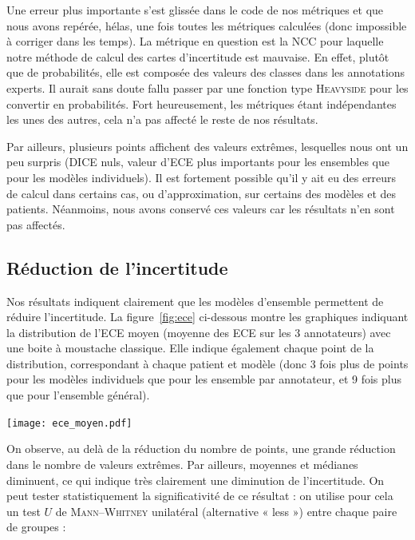 \documentclass[a4paper,french,bookmarks,12pt]{article}
\begin{document}
    Une erreur plus importante s'est glissée dans le code de nos métriques et que nous avons repérée, hélas, une fois toutes les métriques calculées (donc impossible à corriger dans les temps). La métrique en question est la NCC pour laquelle notre méthode de calcul des cartes d'incertitude est mauvaise. En effet, plutôt que de probabilités, elle est composée des valeurs des classes dans les annotations experts. Il aurait sans doute fallu passer par une fonction type \textsc{Heavyside} pour les convertir en probabilités. Fort heureusement, les métriques étant indépendantes les unes des autres, cela n'a pas affecté le reste de nos résultats.

    Par ailleurs, plusieurs points affichent des valeurs extrêmes, lesquelles nous ont un peu surpris (DICE nuls, valeur d'ECE plus importants pour les ensembles que pour les modèles individuels). Il est fortement possible qu'il y ait eu des erreurs de calcul dans certains cas, ou d'approximation, sur certains des modèles et des patients. Néanmoins, nous avons conservé ces valeurs car les résultats n'en sont pas affectés. 

    \subsection{Réduction de l'incertitude}
    
    Nos résultats indiquent clairement que les modèles d'ensemble permettent de réduire l'incertitude. La figure~\ref{fig:ece} ci-dessous montre les graphiques  indiquant la distribution de l'ECE moyen (moyenne des ECE sur les 3 annotateurs) avec une boite à moustache classique. Elle indique également chaque point de la distribution, correspondant à chaque patient et modèle (donc 3 fois plus de points pour les modèles individuels que pour les ensemble par annotateur, et 9 fois plus que pour l'ensemble général).

    \begin{center}
        \centering
        \texttt{[image: ece\_moyen.pdf]}
        \label{fig:ece}
    \end{center}
    
    On observe, au delà de la réduction du nombre de points, une grande réduction dans le nombre de valeurs extrêmes. Par ailleurs, moyennes et médianes diminuent, ce qui indique très clairement une diminution de l'incertitude. On peut tester statistiquement la significativité de ce résultat : on utilise pour cela un test $U$ de \textsc{Mann–Whitney} \parencite{mann1947test} unilatéral (alternative « less ») entre chaque paire de groupes :
\end{document}
